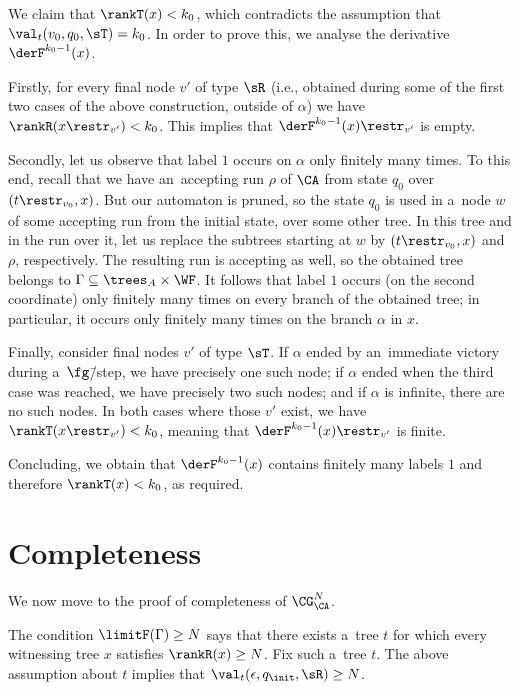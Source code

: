 We claim that $\rankT(x)< k_0$, which contradicts the assumption that $\val_t(v_0,q_0,\sT)=k_0$.
In order to prove this, we analyse the derivative $\derF^{k_0-1}(x)$.

Firstly, for every final node $v'$ of type $\sR$ (i.e., obtained during some of the first two cases of the above construction, outside of $\alpha$) we have $\rankR(x\restr_{v'})<k_0$.
This implies that $\derF^{k_0-1}(x)\restr_{v'}$ is empty.

Secondly, let us observe that label $1$ occurs on $\alpha$ only finitely many times.
To this end, recall that we have an~accepting run $\rho$ of $\CA$ from state $q_0$ over $(t\restr_{v_0},x)$.
But our automaton is pruned, so the state $q_0$ is used in a~node $w$ of some accepting run from the initial state, over some other tree.
In this tree and in the run over it, let us replace the subtrees starting at $w$ by $(t\restr_{v_0},x)$ and $\rho$, respectively.
The resulting run is accepting as well, so the obtained tree belongs to $\Gamma\subseteq\trees_A\times\WF$.
It follows that label $1$ occurs (on the second coordinate) only finitely many times on every branch of the obtained tree;
in particular, it occurs only finitely many times on the branch $\alpha$ in $x$.

Finally, consider final nodes $v'$ of type $\sT$.
If $\alpha$ ended by an~immediate victory during a~$\fg$\=/step, we have precisely one such node;
if $\alpha$ ended when the third case was reached, we have precisely two such nodes;
and if $\alpha$ is infinite, there are no such nodes.
In both cases where those $v'$ exist, we have $\rankT(x\restr_{v'})<k_0$, meaning that $\derF^{k_0-1}(x)\restr_{v'}$ is finite.

Concluding, we obtain that $\derF^{k_0-1}(x)$ contains finitely many labels $1$ and therefore $\rankT(x)<k_0$, as required.



\section{Completeness}
\label{sec:completeness}

We now move to the proof of completeness of $\CG^N_\CA$.

\lemCompleteness*

\noindent %
The condition $\limitF(\Gamma)\geq N$ says that there exists a~tree $t$ for which every witnessing tree $x$ satisfies $\rankR(x)\geq N$.
Fix such a~tree $t$.
The above assumption about $t$ implies that $\val_t(\epsilon,q_\init,\sR)\geq N$.

